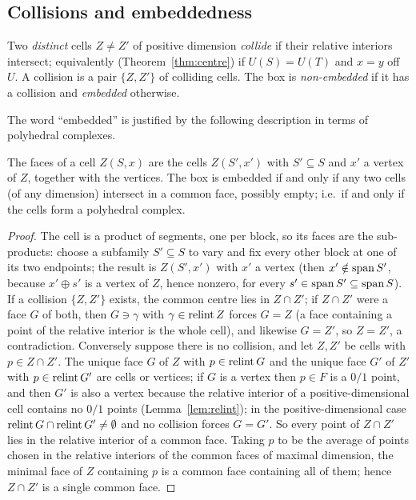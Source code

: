 \subsection{Collisions and embeddedness}

\begin{definition}\label{def:collision}
Two \emph{distinct} cells $Z\ne Z'$ of positive dimension \emph{collide} if their relative interiors intersect; equivalently (Theorem~\ref{thm:centre}) if $U(S)=U(T)$ and $x=y$ off $U$. A collision is a pair $\{Z,Z'\}$ of colliding cells. The box is \emph{non-embedded} if it has a collision and \emph{embedded} otherwise.
\end{definition}

The word ``embedded'' is justified by the following description in terms of polyhedral complexes.

\begin{proposition}\label{prop:facetoface}
The faces of a cell $Z(S,x)$ are the cells $Z(S',x')$ with $S'\subseteq S$ and $x'$ a vertex of $Z$, together with the vertices. The box is embedded if and only if any two cells (of any dimension) intersect in a common face, possibly empty; i.e.\ if and only if the cells form a polyhedral complex.
\end{proposition}

\begin{proof}
The cell is a product of segments, one per block, so its faces are the sub-products: choose a subfamily $S'\subseteq S$ to vary and fix every other block at one of its two endpoints; the result is $Z(S',x')$ with $x'$ a vertex (then $x'\notin\operatorname{span} S'$, because $x'\oplus s'$ is a vertex of $Z$, hence nonzero, for every $s'\in\operatorname{span} S'\subseteq\operatorname{span} S$). If a collision $\{Z,Z'\}$ exists, the common centre lies in $Z\cap Z'$; if $Z\cap Z'$ were a face $G$ of both, then $G\ni\gamma$ with $\gamma\in\operatorname{relint} Z$ forces $G=Z$ (a face containing a point of the relative interior is the whole cell), and likewise $G=Z'$, so $Z=Z'$, a contradiction. Conversely suppose there is no collision, and let $Z,Z'$ be cells with $p\in Z\cap Z'$. The unique face $G$ of $Z$ with $p\in\operatorname{relint} G$ and the unique face $G'$ of $Z'$ with $p\in\operatorname{relint} G'$ are cells or vertices; if $G$ is a vertex then $p\in F$ is a $0/1$ point, and then $G'$ is also a vertex because the relative interior of a positive-dimensional cell contains no $0/1$ points (Lemma~\ref{lem:relint}); in the positive-dimensional case $\operatorname{relint} G\cap\operatorname{relint} G'\ne\emptyset$ and no collision forces $G=G'$. So every point of $Z\cap Z'$ lies in the relative interior of a common face. Taking $p$ to be the average of points chosen in the relative interiors of the common faces of maximal dimension, the minimal face of $Z$ containing $p$ is a common face containing all of them; hence $Z\cap Z'$ is a single common face.
\end{proof}

